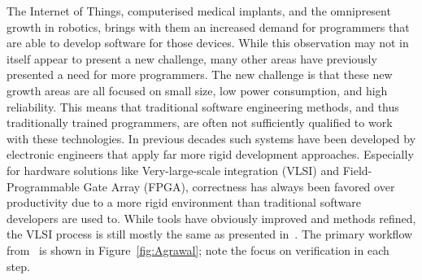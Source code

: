 The Internet of Things, computerised medical implants, and the omnipresent growth in robotics, brings with them an increased demand for programmers that are able to develop software for those devices. While this observation may not in itself appear to present a new challenge, many other areas have previously presented a need for more programmers. The new challenge is that these new growth areas are all focused on small size, low power consumption, and high reliability. This means that traditional software engineering methods, and thus traditionally trained programmers, are often not sufficiently qualified to work with these technologies.
In previous decades such systems have been developed by electronic engineers that apply far more rigid development approaches. Especially for hardware solutions like Very-large-scale integration (VLSI) and Field-Programmable Gate Array (FPGA), correctness has always been favored over productivity due to a more rigid environment than traditional software developers are used to.
While tools have obviously improved and methods refined, the VLSI process is still mostly the same as presented in~\cite{Agrawal:1985:VDP:320599.322570}. The primary workflow from~\cite{Agrawal:1985:VDP:320599.322570} is shown in Figure~\ref{fig:Agrawal}; note the focus on verification in each step.
